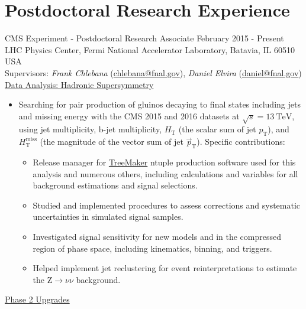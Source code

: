 \setlength{\parskip}{0pt}
\def\hslash{{\hbox{$H$\kern-0.8em\lower-.05ex\hbox{/}\kern0.10em}}}
\section{Postdoctoral Research Experience}
CMS Experiment - Postdoctoral Research Associate \hfill February 2015 - Present\\
LHC Physics Center, Fermi National Accelerator Laboratory, Batavia, IL 60510 USA\\
Supervisors: {\sl Frank Chlebana} (\href{mailto:chlebana@fnal.gov}{chlebana@fnal.gov}), {\sl Daniel Elvira} (\href{mailto:daniel@fnal.gov}{daniel@fnal.gov})\\
\underline{Data Analysis: Hadronic Supersymmetry}
\begin{itemize}[leftmargin=12pt]
\item Searching for pair production of gluinos decaying to final states including jets and missing energy with the CMS 2015 and 2016 datasets at $\sqrt{s}=13~\text{TeV}$, using jet multiplicity, b-jet multiplicity, $H_{\text{T}}$ (the scalar sum of jet $p_{\text{T}}$), and $H_{\text{T}}^{\text{miss}}$ (the magnitude of the vector sum of jet $\vec{p}_{\text{T}}$). Specific contributions:
\begin{itemize}
\item Release manager for \href{https://github.com/TreeMaker/TreeMaker}{TreeMaker} ntuple production software used for this analysis and numerous others, including calculations and variables for all background estimations and signal selections.
\item Studied and implemented procedures to assess corrections and systematic uncertainties in simulated signal samples.
\item Investigated signal sensitivity for new models and in the compressed region of phase space, including kinematics, binning, and triggers.
\item Helped implement jet reclustering for event reinterpretations to estimate the $\text{Z}\to\nu\nu$ background.
\end{itemize}
\end{itemize}
\underline{Phase 2 Upgrades}
